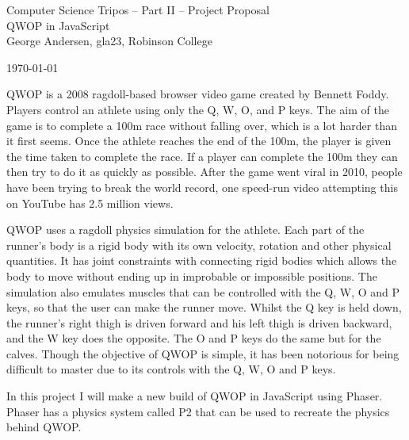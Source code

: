 \documentclass[12pt,a4paper,twoside]{article}
\begin{document}
\begin{center}
\Large
Computer Science Tripos -- Part II -- Project Proposal\\[4mm]
\LARGE
QWOP in JavaScript \\[4mm]

\large
George Andersen, gla23, Robinson College

\today

\end{center}



QWOP is a 2008 ragdoll-based browser video game created by Bennett Foddy. Players control an athlete using only the Q, W, O, and P keys. The aim of the game is to complete a 100m race without falling over, which is a lot harder than it first seems.
Once the athlete reaches the end of the 100m, the player is given the time taken to complete the race. If a player can complete the 100m they can then try to do it as quickly as possible. After the game went viral in 2010, people have been trying to break the world record, one speed-run video attempting this on YouTube has 2.5 million views.

QWOP uses a ragdoll physics simulation for the athlete. Each part of the runner's body is a rigid body with its own velocity, rotation and other physical quantities. It has joint constraints with connecting rigid bodies which allows the body to move without ending up in improbable or impossible positions.
The simulation also emulates muscles that can be controlled with the Q, W, O and P keys, so that the user can make the runner move. 
Whilst the Q key is held down, the runner's right thigh is driven forward and his left thigh is driven backward, and the W key does the opposite. The O and P keys do the same but for the calves.
Though the objective of QWOP is simple, it has been notorious for being difficult to master due to its controls with the Q, W, O and P keys.


In this project I will make a new build of QWOP in JavaScript using Phaser. Phaser has a physics system called P2 that can be used to recreate the physics behind QWOP.
\end{document}
